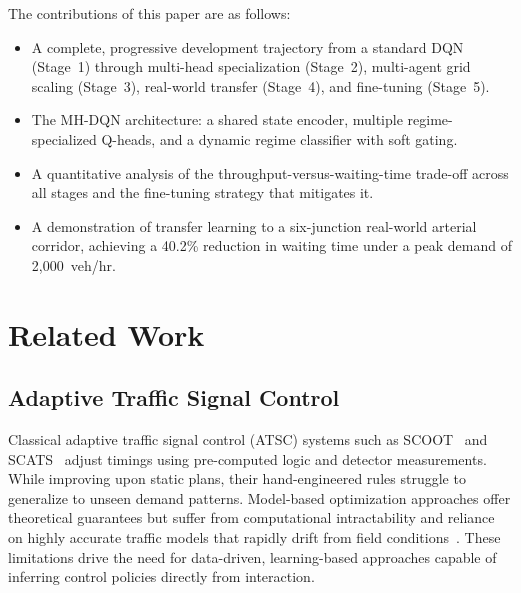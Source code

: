 \documentclass[lettersize,journal]{IEEEtran}
\begin{document}
The contributions of this paper are as follows:
\begin{itemize}
    \item A complete, progressive development trajectory from a standard
          DQN (Stage~1) through multi-head specialization (Stage~2),
          multi-agent grid scaling (Stage~3), real-world transfer
          (Stage~4), and fine-tuning (Stage~5).
    \item The MH-DQN architecture: a shared state encoder, multiple
          regime-specialized Q-heads, and a dynamic regime classifier with
          soft gating.
    \item A quantitative analysis of the throughput-versus-waiting-time
          trade-off across all stages and the fine-tuning strategy that
          mitigates it.
    \item A demonstration of transfer learning to a six-junction
          real-world arterial corridor, achieving a 40.2\% reduction in
          waiting time under a peak demand of 2{,}000~veh/hr.
\end{itemize}

\section{Related Work}
\label{sec:related}

\subsection{Adaptive Traffic Signal Control}
Classical adaptive traffic signal control (ATSC) systems such as SCOOT~\cite{hunt1982scoot} and SCATS~\cite{sims1980scats} adjust timings using pre-computed logic and detector measurements. While improving upon static plans, their hand-engineered rules struggle to generalize to unseen demand patterns. Model-based optimization approaches offer theoretical guarantees but suffer from computational intractability and reliance on highly accurate traffic models that rapidly drift from field conditions~\cite{chen2022realdeal}. These limitations drive the need for data-driven, learning-based approaches capable of inferring control policies directly from interaction.
\end{document}
